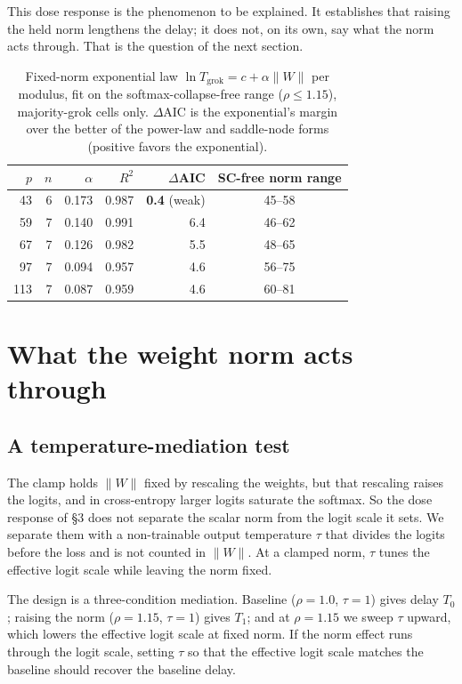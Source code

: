 This dose response is the phenomenon to be explained. It establishes that raising the held norm lengthens
the delay; it does not, on its own, say what the norm acts through. That is the question of the next
section.

\begin{table}[h]\centering\small
\caption{Fixed-norm exponential law $\ln T_{\mathrm{grok}}=c+\alpha\|W\|$ per modulus, fit on the
softmax-collapse-free range ($\rho\le 1.15$), majority-grok cells only. $\Delta$AIC is the exponential's
margin over the better of the power-law and saddle-node forms (positive favors the exponential).}
\label{tab:a1}
\begin{tabular}{rrrrrc}
\toprule
$p$ & $n$ & $\alpha$ & $R^2$ & $\Delta$AIC & SC-free norm range \\
\midrule
43  & 6 & 0.173 & 0.987 & \textbf{0.4} (weak) & 45--58 \\
59  & 7 & 0.140 & 0.991 & 6.4 & 46--62 \\
67  & 7 & 0.126 & 0.982 & 5.5 & 48--65 \\
97  & 7 & 0.094 & 0.957 & 4.6 & 56--75 \\
113 & 7 & 0.087 & 0.959 & 4.6 & 60--81 \\
\bottomrule
\end{tabular}
\end{table}

\section{What the weight norm acts through}

\subsection{A temperature-mediation test}\label{sec:med}

The clamp holds $\|W\|$ fixed by rescaling the weights, but that rescaling raises the logits, and in
cross-entropy larger logits saturate the softmax. So the dose response of \S3 does not separate the scalar
norm from the logit scale it sets. We separate them with a non-trainable output temperature $\tau$ that
divides the logits before the loss and is not counted in $\|W\|$. At a clamped norm, $\tau$ tunes the
effective logit scale while leaving the norm fixed.

The design is a three-condition mediation. Baseline ($\rho=1.0$, $\tau=1$) gives delay $T_0$; raising the
norm ($\rho=1.15$, $\tau=1$) gives $T_1$; and at $\rho=1.15$ we sweep $\tau$ upward, which lowers the
effective logit scale at fixed norm. If the norm effect runs through the logit scale, setting $\tau$ so
that the effective logit scale matches the baseline should recover the baseline delay.

